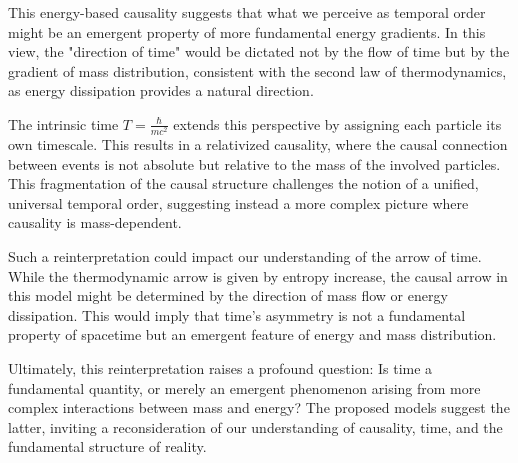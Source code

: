 \documentclass[a4paper,12pt]{article}
\begin{document}
	This energy-based causality suggests that what we perceive as temporal order might be an emergent property of more fundamental energy gradients. In this view, the "direction of time" would be dictated not by the flow of time but by the gradient of mass distribution, consistent with the second law of thermodynamics, as energy dissipation provides a natural direction.
	
	The intrinsic time \( T = \frac{\hbar}{m c^2} \) extends this perspective by assigning each particle its own timescale. This results in a relativized causality, where the causal connection between events is not absolute but relative to the mass of the involved particles. This fragmentation of the causal structure challenges the notion of a unified, universal temporal order, suggesting instead a more complex picture where causality is mass-dependent.
	
	Such a reinterpretation could impact our understanding of the arrow of time. While the thermodynamic arrow is given by entropy increase, the causal arrow in this model might be determined by the direction of mass flow or energy dissipation. This would imply that time’s asymmetry is not a fundamental property of spacetime but an emergent feature of energy and mass distribution.
	
	Ultimately, this reinterpretation raises a profound question: Is time a fundamental quantity, or merely an emergent phenomenon arising from more complex interactions between mass and energy? The proposed models suggest the latter, inviting a reconsideration of our understanding of causality, time, and the fundamental structure of reality.
	
\end{document}
